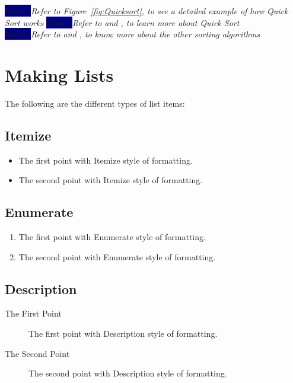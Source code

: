 \documentclass{article}
\begin{document}
\textbf{\colorbox{darkBlue}{\textcolor{faintBlue}{Note: }}}\textit{Refer to Figure~\ref{fig:Quicksort}, to see a detailed example of how Quick Sort works}
\textbf{\colorbox{darkBlue}{\textcolor{faintBlue}{Note: }}}\textit{Refer to \cite{10.1093/comjnl/5.1.10} and \cite{10.1145/359619.359631}, to learn more about Quick Sort}\\
\textbf{\colorbox{darkBlue}{\textcolor{faintBlue}{Note: }}}\textit{Refer to \cite{10.1145/146370.146381} and \cite{satish2009designing}, to know more about the other sorting algorithms}\\
    
    
    
\clearpage

\section{Making Lists}  \label{Lists}       %
The following are the different types of list items:
\subsection{Itemize}
\begin{itemize}
    \item The first point with Itemize style of formatting.
    \item The second point with Itemize style of formatting.
\end{itemize}

\subsection{Enumerate}
\begin{enumerate}
    \item The first point with Enumerate style of formatting.
    \item The second point with Enumerate style of formatting.
\end{enumerate}

\subsection{Description}
\begin{description}
    \item [\tab The First Point] The first point with Description style of formatting.
    \item [\tab The Second Point] The second point with Description style of formatting.
\end{description}
\end{document}
